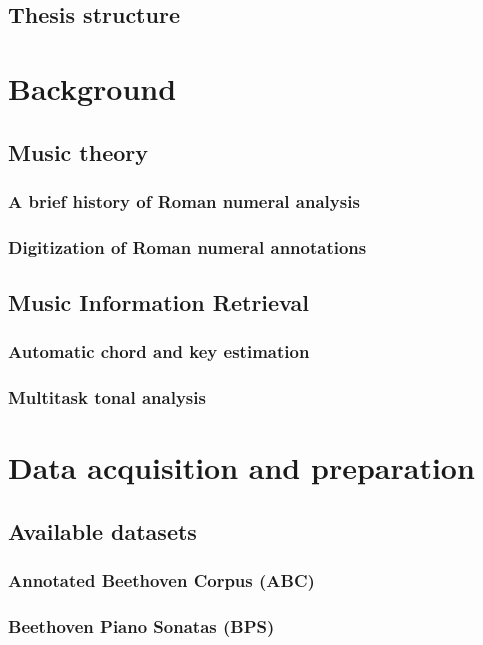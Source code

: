 \documentclass[12pt]{article}
\begin{document}
\subsection{Thesis structure}

\section{Background}
\subsection{Music theory}
\subsubsection{A brief history of Roman numeral analysis}
\subsubsection{Digitization of Roman numeral annotations}

\subsection{Music Information Retrieval}
\subsubsection{Automatic chord and key estimation}
\subsubsection{Multitask tonal analysis}

\section{Data acquisition and preparation}
\subsection{Available datasets}
\subsubsection{Annotated Beethoven Corpus (ABC)}
\subsubsection{Beethoven Piano Sonatas (BPS)}
\end{document}
